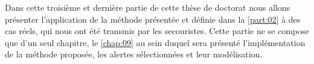 Dans cette troisième et dernière partie de cette thèse de doctorat
nous allons présenter l’application de la méthode présentée et définie
dans la \autoref{part:02} à des cas réels, qui nous ont été transmis
par les secouristes. Cette partie ne se compose que d'un seul
chapitre, le \ref{chap:09} au sein duquel sera présenté
l'implémentation de la méthode proposée, les alertes sélectionnées et
leur modélisation.

